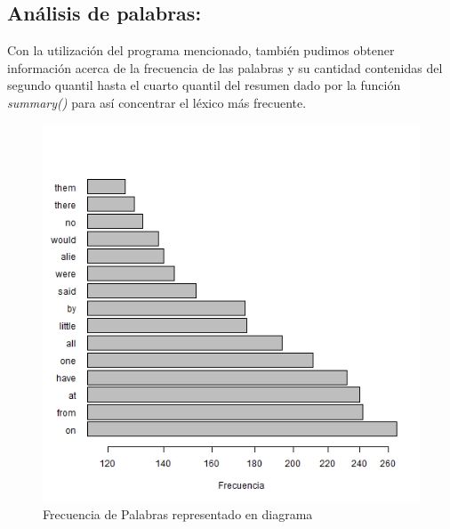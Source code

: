 \documentclass[]{article}
\begin{document}
\subsection{Análisis de palabras:}
Con la utilización del programa mencionado, también pudimos obtener información acerca de la frecuencia de las palabras y su cantidad contenidas del segundo quantil hasta el cuarto quantil del resumen dado por la función \textit{summary()} para así concentrar el léxico más frecuente. 

\begin{figure}[H]
    \centering
    \includegraphics[width=.5\linewidth]{Palabras.png}    \caption{Frecuencia de Palabras representado en diagrama}
    \label{fig:palabras}
\end{figure}


\printbibliography[title={Referencias}]
\end{document}
